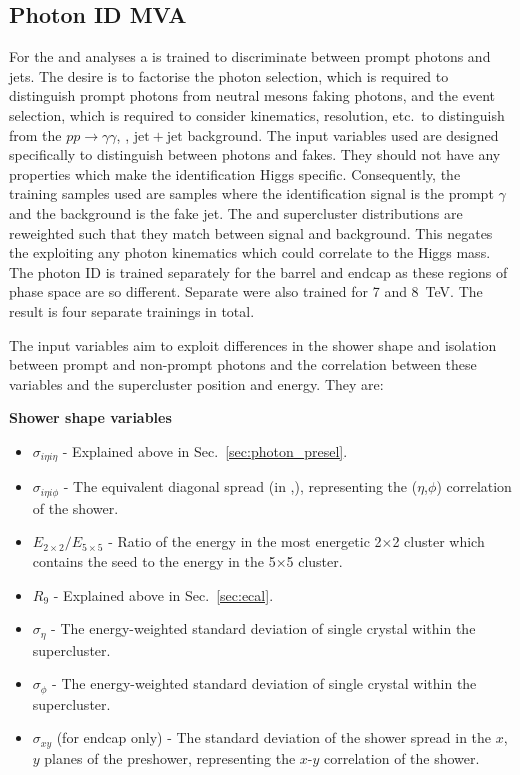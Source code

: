\subsection{Photon ID \acs{MVA}}
\label{sec:pho_id_mva}

For the \MFM and \SMVA analyses a \BDT is trained to discriminate between prompt photons and jets. The desire is to factorise the photon selection, which is required to distinguish prompt photons from neutral mesons faking photons, and the event selection, which is required to consider kinematics, resolution, etc.~to distinguish \Hgg from the $pp\rightarrow\gamma\gamma$, \gjet, $\mathrm{jet}+\mathrm{jet}$ background. The input variables used are designed specifically to distinguish between photons and fakes. They should not have any properties which make the identification Higgs specific. Consequently, the training samples used are \gjet samples where the identification \BDT signal is the prompt $\gamma$ and the background is the fake jet. The \pT and supercluster \eta distributions are reweighted such that they match between signal and background. This negates the \BDT exploiting any photon kinematics which could correlate to the Higgs mass. The photon ID \BDT is trained separately for the barrel and endcap as these regions of phase space are so different. Separate \BDTs were also trained for 7 and 8~TeV. The result is four separate trainings in total.

The input variables aim to exploit differences in the shower shape and isolation between prompt and non-prompt photons and the correlation between these variables and the supercluster position and energy. They are:

\noindent\textbf{Shower shape variables}
\begin{itemize}
  \item $\sigma_{i\eta i\eta}$ - Explained above in Sec.~\ref{sec:photon_presel}.
  \item $\sigma_{i\eta i\phi}$ - The equivalent diagonal spread (in \eta,\phi), representing the ($\eta$,$\phi$) correlation of the shower.
  \item $E_{2\times2}/E_{5\times5}$ - Ratio of the energy in the most energetic 2$\times$2 cluster which contains the seed to the energy in the 5$\times$5 cluster.
  \item $R_{9}$ - Explained above in Sec.~\ref{sec:ecal}.
  \item $\sigma_{\eta}$ - The energy-weighted standard deviation of single crystal \eta within the supercluster.
  \item $\sigma_{\phi}$ - The energy-weighted standard deviation of single crystal \phi within the supercluster.
  \item $\sigma_{xy}$ (for endcap only) - The standard deviation of the shower spread in the $x$, $y$ planes of the preshower, representing the $x$-$y$ correlation of the shower.
\end{itemize}

